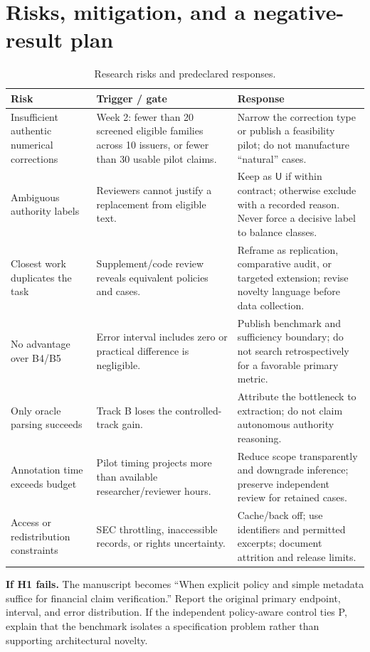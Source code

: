 \documentclass[11pt,a4paper]{article}
\newcommand{\lead}[1]{\textbf{\color{navy}#1}}
\newcommand{\Ulabel}{\mathsf{U}}
\begin{document}
\section{Risks, mitigation, and a negative-result plan}
\begin{table}[H]\caption{Research risks and predeclared responses.}
\small\begin{tabularx}{\linewidth}{p{.27\linewidth}YY}\toprule
Risk & Trigger / gate & Response\\\midrule
Insufficient authentic numerical corrections & Week 2: fewer than 20 screened eligible families across 10 issuers, or fewer than 30 usable pilot claims. & Narrow the correction type or publish a feasibility pilot; do not manufacture “natural” cases.\\
Ambiguous authority labels & Reviewers cannot justify a replacement from eligible text. & Keep as $\Ulabel$ if within contract; otherwise exclude with a recorded reason. Never force a decisive label to balance classes.\\
Closest work duplicates the task & Supplement/code review reveals equivalent policies and cases. & Reframe as replication, comparative audit, or targeted extension; revise novelty language before data collection.\\
No advantage over B4/B5 & Error interval includes zero or practical difference is negligible. & Publish benchmark and sufficiency boundary; do not search retrospectively for a favorable primary metric.\\
Only oracle parsing succeeds & Track B loses the controlled-track gain. & Attribute the bottleneck to extraction; do not claim autonomous authority reasoning.\\
Annotation time exceeds budget & Pilot timing projects more than available researcher/reviewer hours. & Reduce scope transparently and downgrade inference; preserve independent review for retained cases.\\
Access or redistribution constraints & SEC throttling, inaccessible records, or rights uncertainty. & Cache/back off; use identifiers and permitted excerpts; document attrition and release limits.\\\bottomrule
\end{tabularx}\end{table}

\lead{If H1 fails.} The manuscript becomes “When explicit policy and simple metadata suffice for financial claim verification.” Report the original primary endpoint, interval, and error distribution. If the independent policy-aware control ties P, explain that the benchmark isolates a specification problem rather than supporting architectural novelty.
\end{document}
